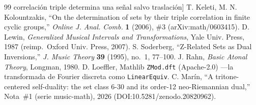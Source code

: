 \documentclass[11pt]{article}
\newcommand{\lean}[1]{\texttt{#1}}
\begin{document}
\begin{thebibliography}{99}
  correlación triple determina una señal salvo traslación]
 T. Keleti, M. N. Kolountzakis, ``On the determination of sets by their triple correlation in
  finite cyclic groups,'' \emph{Online J. Anal. Comb.} \textbf{1} (2006), \#3 (arXiv:math/0603415).
 D. Lewin, \emph{Generalized Musical Intervals and Transformations}, Yale Univ. Press,
  1987 (reimp.\ Oxford Univ. Press, 2007).
 S. Soderberg, ``Z-Related Sets as Dual Inversions,'' \emph{J. Music Theory} \textbf{39}
  (1995), no.~1, 77--100.
 J. Rahn, \emph{Basic Atonal Theory}, Longman, 1980.
 D. Loeffler, Mathlib \lean{ZMod.dft} (Apache-2.0) ---la transformada de Fourier discreta
  como \lean{LinearEquiv}.
 C. Mar\'in, ``A tritone-centered self-duality: the set class 6-30 and its order-12
  neo-Riemannian dual,'' Nota~\#1 (serie music-math), 2026 (DOI:10.5281/zenodo.20820962).
\end{thebibliography}
\end{document}
